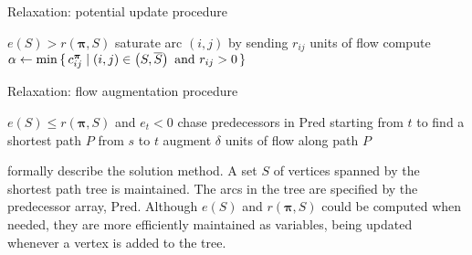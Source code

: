 \begin{algorithm}
    \caption{Relaxation: potential update procedure}
    \label{algo:relaxation-update-potentials}
    \begin{algorithmic}[1]
        \Require $e(S) > r(\boldsymbol{\pi},S)$
        \Statex
         \label{algo:relaxation-update-potentials:saturate-loop}
        \State saturate arc $(i,j)$ by sending $r_{ij}$ units of flow \label{algo:relaxation-update-potentials:saturate-cmd}
        \EndFor
        \State compute $\alpha \gets \min\set{c_{ij}^{\boldsymbol{\pi}} | (i,j)\in\left(S,\overline{S}\right)\mbox{ and }r_{ij}>0}$
        \label{algo:relaxation-update-potentials:compute-alpha}
        \label{algo:relaxation-update-potentials:update-loop}
        \label{algo:relaxation-update-potentials:update-cmd}
        \EndFor
        \EndFunction
    \end{algorithmic}
\end{algorithm}

\begin{algorithm}
    \caption{Relaxation: flow augmentation procedure}
    \label{algo:relaxation-augment-flow}
    \begin{algorithmic}[1]
        \Require $e(S) \leq r(\boldsymbol{\pi},S)$ and $e_t < 0$
        \Statex
        \State chase predecessors in $\mathrm{Pred}$ starting from $t$ to find a shortest path $P$ from $s$ to $t$ \label{algo:relaxation-augment-flow:find-P}
         \label{algo:relaxation-augment-flow:compute-delta}
        \State augment $\delta$ units of flow along path $P$ \label{algo:relaxation-augment-flow:augment-path}
        \EndFunction
    \end{algorithmic}
\end{algorithm}

 formally describe the solution method. A set $S$ of vertices spanned by the shortest path tree is maintained. The arcs in the tree are specified by the predecessor array, $\mathrm{Pred}$. Although $e(S)$ and $r(\boldsymbol{\pi},S)$ could be computed when needed, they are more efficiently maintained as variables, being updated whenever a vertex is added to the tree.

